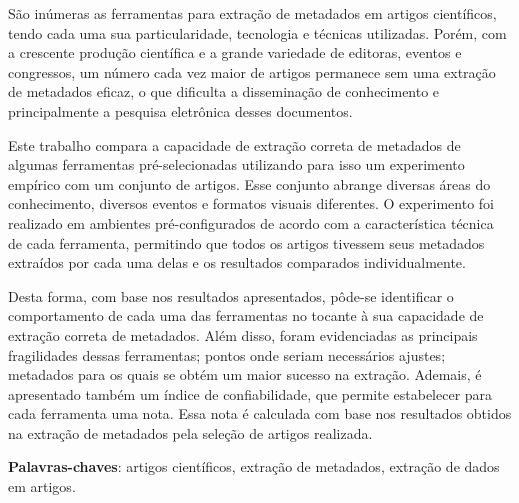
\setlength{\absparsep}{18pt} %
\begin{resumo}


São inúmeras as ferramentas para extração de metadados em artigos científicos, tendo cada uma sua particularidade, tecnologia e técnicas utilizadas. Porém, com a crescente produção científica e a grande variedade de editoras, eventos e congressos, um número cada vez maior de artigos permanece sem uma extração de metadados eficaz, o que dificulta a disseminação de conhecimento e principalmente a pesquisa eletrônica desses documentos.

Este trabalho compara a capacidade de extração correta de metadados de algumas ferramentas pré-selecionadas utilizando para isso um experimento empírico com um conjunto de artigos. Esse conjunto abrange diversas áreas do conhecimento, diversos eventos e formatos visuais diferentes. O experimento foi realizado em ambientes pré-configurados de acordo com a característica técnica de cada ferramenta, permitindo que todos os artigos tivessem seus metadados extraídos por cada uma delas e os resultados comparados individualmente. 

Desta forma, com base nos resultados apresentados, pôde-se identificar o comportamento de cada uma das ferramentas no tocante à sua capacidade de extração correta de metadados. Além disso, foram evidenciadas as principais fragilidades dessas ferramentas; pontos onde seriam necessários ajustes; metadados para os quais se obtém um maior sucesso na extração. Ademais, é apresentado também um índice de confiabilidade, que permite estabelecer para cada ferramenta uma nota. Essa nota é calculada com base nos resultados obtidos na extração de metadados pela seleção de artigos realizada.

\textbf{Palavras-chaves}: artigos científicos, extração de metadados, extração de dados em artigos.

\end{resumo}

